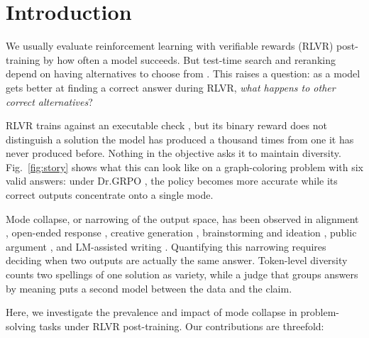 \documentclass{article}
\newcommand{\1}{\mathbf 1}
\theoremstyle{remark}
\theoremstyle{definition}
\theoremstyle{plain}
\begin{document}
\section{Introduction}
\label{sec:introduction}

We usually evaluate reinforcement learning with verifiable rewards (RLVR)
post-training by how often a model succeeds. But test-time search and reranking
depend on having alternatives to choose from
\citep{brown2024monkeys,snell2024testtime,cobbe2021training,wang2023selfconsistency}.
This raises a question: as a model gets better at finding a correct answer
during RLVR, \textit{what happens to other correct alternatives}?

RLVR trains against an executable check \citep{guo2025deepseekr1}, but its
binary reward does not distinguish a solution the model has produced a thousand
times from one it has never produced before. Nothing in the objective asks it
to maintain diversity. Fig.~\ref{fig:story} shows what this can look like on a
graph-coloring problem with six valid answers: under Dr.GRPO
\citep{liu2025understanding}, the policy becomes more accurate while its
correct outputs concentrate onto a single mode.

Mode collapse, or narrowing of the output space, has been observed in alignment
\citep{kirk2024understanding,cui2025entropy}, open-ended response
\citep{jiang2025hivemind}, creative generation
\citep{doshi2024generative}, brainstorming and ideation
\citep{anderson2024homogenization,meincke2025chatgpt}, public argument
\citep{kim2026argument,shahid2025homogenize}, and LM-assisted writing
\citep{abdulhai2026distort}. Quantifying this narrowing requires deciding when
two outputs are actually the same answer. Token-level diversity
\citep{li2016diversity,zhu2018texygen} counts two spellings of one solution as
variety, while a judge that groups answers by meaning
\citep{farquhar2024detecting,zheng2023judging} puts a second model between the
data and the claim.

Here, we investigate the prevalence and impact of mode collapse in
problem-solving tasks under RLVR post-training. Our contributions are
threefold:
\end{document}
